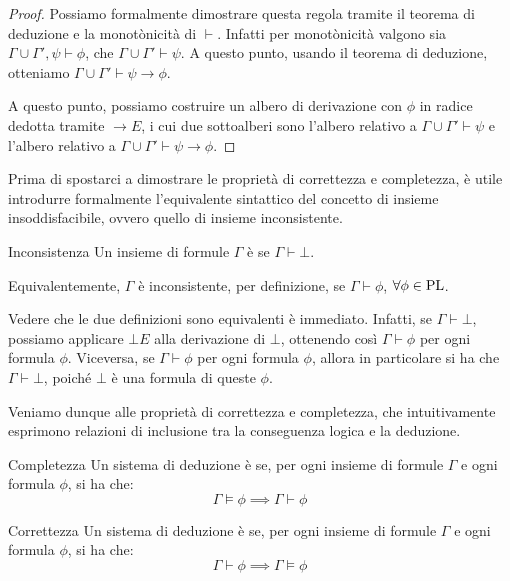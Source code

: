 \begin{proof}
  Possiamo formalmente dimostrare questa regola tramite il teorema di deduzione e la monotònicità di \(\vdash\).
  Infatti per monotònicità valgono sia \(\Gamma \cup \Gamma', \psi \vdash \phi\), che \(\Gamma \cup \Gamma'\vdash \psi\).
  A questo punto, usando il teorema di deduzione, otteniamo \(\Gamma\cup \Gamma' \vdash \psi \to \phi\).

  A questo punto, possiamo costruire un albero di derivazione con \(\phi\) in radice dedotta tramite \(\to E\), i cui due sottoalberi sono l'albero relativo a \(\Gamma \cup \Gamma' \vdash \psi\) e l'albero relativo a \(\Gamma\cup \Gamma' \vdash \psi \to \phi\).
\end{proof}

Prima di spostarci a dimostrare le proprietà di correttezza e completezza, è utile introdurre formalmente l'equivalente sintattico del concetto di insieme insoddisfacibile, ovvero quello di insieme inconsistente.

\begin{definition}{Inconsistenza}
  Un insieme di formule \(\Gamma\) è  se \(\Gamma \vdash \bot\).

  Equivalentemente, \(\Gamma\) è inconsistente, per definizione, se \(\Gamma \vdash \phi\), \(\forall \phi \in \operatorname{PL}\).
\end{definition}

Vedere che le due definizioni sono equivalenti è immediato.
Infatti, se \(\Gamma \vdash \bot\), possiamo applicare \(\bot E\) alla derivazione di \(\bot\), ottenendo così \(\Gamma \vdash \phi\) per ogni formula \(\phi\). Viceversa, se \(\Gamma \vdash \phi\) per ogni formula \(\phi\), allora in particolare si ha che \(\Gamma \vdash \bot\), poiché \(\bot\) è una formula di queste \(\phi\).

Veniamo dunque alle proprietà di correttezza e completezza, che intuitivamente esprimono relazioni di inclusione tra la conseguenza logica e la deduzione. 

\begin{definition}{Completezza}
  Un sistema di deduzione è  se, per ogni insieme di formule \(\Gamma\) e ogni formula \(\phi\), si ha che:
  \[\Gamma \models \phi \implies \Gamma \vdash \phi\]
\end{definition}

\begin{definition}{Correttezza}
  Un sistema di deduzione è  se, per ogni insieme di formule \(\Gamma\) e ogni formula \(\phi\), si ha che:
  \[\Gamma \vdash \phi \implies \Gamma \models \phi\]
\end{definition}

